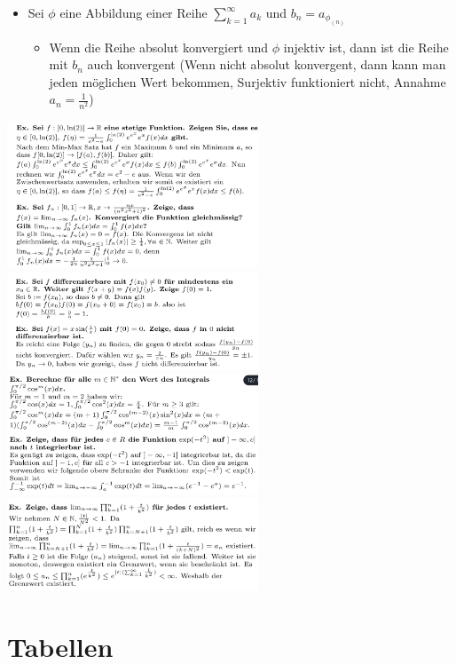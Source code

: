 \documentclass[8pt]{extarticle}
\begin{document}
\begin{multicols*}{3}
\begin{itemize}
 \item Sei $\phi$ eine Abbildung einer Reihe $\sum_{k = 1}^{\infty} a_k$ und $b_n = a_{\phi_{(n)}}$
\begin{itemize}
 \item Wenn die Reihe absolut konvergiert und $\phi$ injektiv ist, dann ist die Reihe mit $b_n$ auch konvergent (Wenn nicht absolut konvergent, dann kann man jeden möglichen Wert bekommen, Surjektiv funktioniert nicht, Annahme $a_n = \frac{1}{n^2}$)
\end{itemize}
\end{itemize}
\begin{center}
\includegraphics[width=7.5cm]{proof2.png} \\
\includegraphics[width=7.5cm]{proof3.png} \\
\includegraphics[width=7.5cm]{proof4.png} \\
\includegraphics[width=7.5cm]{proof5.png} \\

\end{center}
\newpage
\section{Tabellen}

\end{multicols*}
\end{document}
